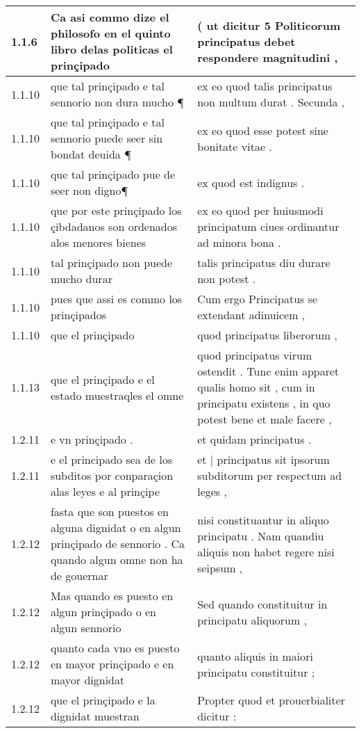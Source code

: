 \begin{tabular}{|p{1cm}|p{6.5cm}|p{6.5cm}|}

\hline
1.1.6 & Ca asi commo dize el philosofo en el quinto libro delas politicas el prinçipado & ( ut dicitur 5 Politicorum principatus debet respondere magnitudini , \\\hline
1.1.10 & que tal prinçipado e tal sennorio non dura mucho ¶ & ex eo quod talis principatus non multum durat . Secunda , \\\hline
1.1.10 & que tal prinçipado e tal sennorio puede seer sin bondat deuida ¶ & ex eo quod esse potest sine bonitate vitae . \\\hline
1.1.10 & que tal prinçipado pue de seer non digno¶ & ex quod est indignus . \\\hline
1.1.10 & que por este prinçipado los çibdadanos son ordenados alos menores bienes & ex eo quod per huiusmodi principatum ciues ordinantur ad minora bona . \\\hline
1.1.10 & tal prinçipado non puede mucho durar & talis principatus diu durare non potest . \\\hline
1.1.10 & pues que assi es commo los prinçipados & Cum ergo Principatus se extendant adinuicem , \\\hline
1.1.10 & que el prinçipado & quod principatus liberorum , \\\hline
1.1.13 & que el prinçipado e el estado muestraqles el omne & quod principatus virum ostendit . Tunc enim apparet qualis homo sit , cum in principatu existens , in quo potest bene et male facere , \\\hline
1.2.11 & e vn prinçipado . & et quidam principatus . \\\hline
1.2.11 & e el principado sea de los subditos por conparaçion alas leyes e al prinçipe & et | principatus sit ipsorum subditorum per respectum ad leges , \\\hline
1.2.12 & fasta que son puestos en alguna dignidat o en algun prinçipado de sennorio . Ca quando algun omne non ha de gouernar & nisi constituantur in aliquo principatu . Nam quandiu aliquis non habet regere nisi seipsum , \\\hline
1.2.12 & Mas quando es puesto en algun prinçipado o en algun sennorio & Sed quando constituitur in principatu aliquorum , \\\hline
1.2.12 & quanto cada vno es puesto en mayor prinçipado e en mayor dignidat & quanto aliquis in maiori principatu constituitur ; \\\hline
1.2.12 & que el prinçipado e la dignidat muestran & Propter quod et prouerbialiter dicitur : \\\hline

\end{tabular}
